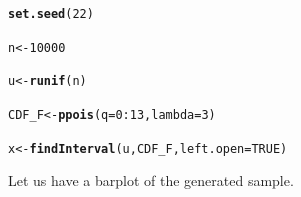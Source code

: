 \documentclass[11pt, a4paper]{article}\usepackage[]{graphicx}\usepackage[]{xcolor}
\makeatletter
\newcommand{\hlnum}[1]{\textcolor[rgb]{0.686,0.059,0.569}{#1}}%
\newcommand{\hlopt}[1]{\textcolor[rgb]{0,0,0}{#1}}%
\newcommand{\hldef}[1]{\textcolor[rgb]{0.345,0.345,0.345}{#1}}%
\newcommand{\hlkwb}[1]{\textcolor[rgb]{0.69,0.353,0.396}{#1}}%
\newcommand{\hlkwc}[1]{\textcolor[rgb]{0.333,0.667,0.333}{#1}}%
\newcommand{\hlkwd}[1]{\textcolor[rgb]{0.737,0.353,0.396}{\textbf{#1}}}%
\newenvironment{kframe}{%
 \def\at@end@of@kframe{}%
 \ifinner\ifhmode%
  \def\at@end@of@kframe{\end{minipage}}%
  \begin{minipage}{\columnwidth}%
 \fi\fi%
 \def\FrameCommand##1{\hskip\@totalleftmargin \hskip-\fboxsep
 \colorbox{shadecolor}{##1}\hskip-\fboxsep
     \hskip-\linewidth \hskip-\@totalleftmargin \hskip\columnwidth}%
 \MakeFramed {\advance\hsize-\width
   \@totalleftmargin\z@ \linewidth\hsize
   \@setminipage}}%
 {\par\unskip\endMakeFramed%
 \at@end@of@kframe}
\newenvironment{knitrout}{}{} %
\makeatother
\begin{document}
\begin{knitrout}
\color{fgcolor}\begin{kframe}
\begin{alltt}
\hlkwd{set.seed}\hldef{(}\hlnum{22}\hldef{)}
\end{alltt}
\end{kframe}
\end{knitrout}


\begin{knitrout}
\color{fgcolor}\begin{kframe}
\begin{alltt}
\hldef{n} \hlkwb{<-} \hlnum{10000}
\end{alltt}
\end{kframe}
\end{knitrout}

\begin{knitrout}
\color{fgcolor}\begin{kframe}
\begin{alltt}
\hldef{u} \hlkwb{<-} \hlkwd{runif}\hldef{(n)}
\end{alltt}
\end{kframe}
\end{knitrout}

\begin{knitrout}
\color{fgcolor}\begin{kframe}
\begin{alltt}
\hldef{CDF_F} \hlkwb{<-} \hlkwd{ppois}\hldef{(}\hlkwc{q} \hldef{=} \hlnum{0}\hlopt{:}\hlnum{13}\hldef{,} \hlkwc{lambda} \hldef{=} \hlnum{3}\hldef{)}
\end{alltt}
\end{kframe}
\end{knitrout}

\begin{knitrout}
\color{fgcolor}\begin{kframe}
\begin{alltt}
\hldef{x} \hlkwb{<-} \hlkwd{findInterval}\hldef{(u, CDF_F,} \hlkwc{left.open} \hldef{=} \hlnum{TRUE}\hldef{)}
\end{alltt}
\end{kframe}
\end{knitrout}

\newpage

Let us have a barplot of the generated sample.
\end{document}
